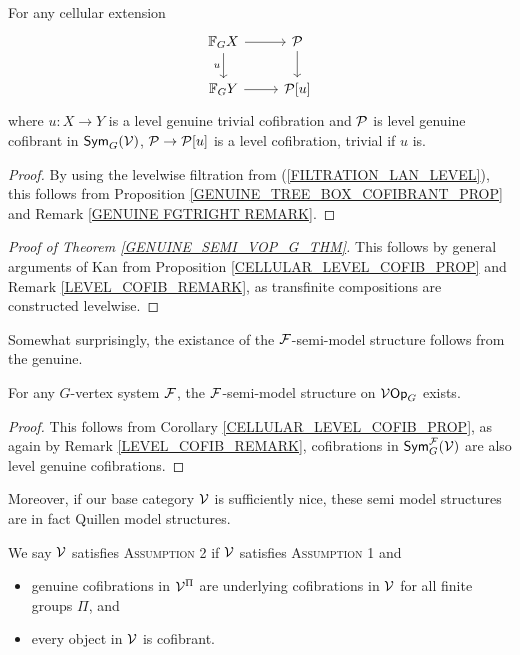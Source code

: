 \documentclass[a4paper,10pt]{article}%
\begin{document}
\begin{corollary}\label{CELLULAR_LEVEL_COFIB_PROP} 
 For any cellular extension  
\[ 
\begin{tikzcd} 
 \mathbb F_G X \arrow[d, "u"'] \arrow[r] & \P \arrow[d]\\ 
\mathbb F_G Y \arrow[r] & \P[u] 
\end{tikzcd} 
\] 
where $u: X \to Y$ is a level genuine trivial cofibration and $\P$ is level genuine cofibrant in $\Sym_G(\V)$, $\P \to \P[u]$ is a level cofibration, trivial if $u$ is. 
\end{corollary}  
\begin{proof} 
 By using the levelwise filtration from (\ref{FILTRATION_LAN_LEVEL}), this follows from Proposition \ref{GENUINE_TREE_BOX_COFIBRANT_PROP} and Remark \ref{GENUINE FGTRIGHT REMARK}. 
\end{proof} 


\begin{proof}[Proof of Theorem \ref{GENUINE_SEMI_VOP_G_THM}] 
 This follows by general arguments of Kan \cite[11.6.1]{Hi03} from Proposition \ref{CELLULAR_LEVEL_COFIB_PROP} and Remark \ref{LEVEL_COFIB_REMARK}, as transfinite compositions are constructed levelwise. 
\end{proof} 


Somewhat surprisingly, the existance of the $\F$-semi-model structure follows from the genuine. 
\begin{corollary} 
  For any $G$-vertex system $\F$, the $\F$-semi-model structure on $\V\Op_G$ exists.  
\end{corollary} 
\begin{proof} 
  This follows from Corollary \ref{CELLULAR_LEVEL_COFIB_PROP}, as again by Remark \ref{LEVEL_COFIB_REMARK}, cofibrations in $\Sym_G^\F(\V)$ are also level genuine cofibrations. %
\end{proof} 

Moreover, if our base category $\V$ is sufficiently nice, these semi model structures are in fact Quillen model structures. 
\begin{definition}
  We say $\V$ satisfies \textsc{Assumption 2} if $\V$ satisfies \textsc{Assumption 1} and
  \begin{itemize}
  \item genuine cofibrations in $\V^\Pi$ are underlying cofibrations in $\V$ for all finite groups $\Pi$, and
  \item every object in $\V$ is cofibrant.
  \end{itemize}
\end{definition}
\end{document}
